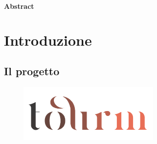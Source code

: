 \documentclass[12pt]{article}
\begin{document}
\newpage

\newpage

\thispagestyle{plain}
\begin{center}
    \vfill
    \Huge
    \textbf{Abstract}
    \vspace{2cm}

\end{center}

\vfill


\newpage
\tableofcontents
\newpage

\section{Introduzione}
\subsection{Il progetto}
\begin{center}
    \begin{figure}[htp]
        \centering
        \includegraphics[width=7cm]{images/tourm_logo_transparent.png}
        \vspace{-2.7\baselineskip}
    \end{figure}
\end{center}
\end{document}

